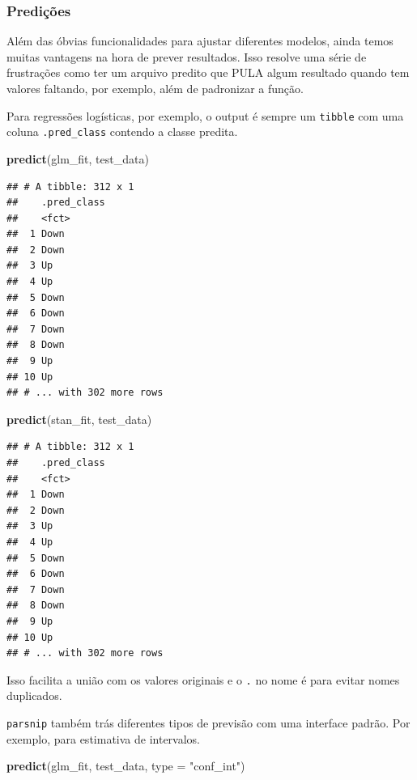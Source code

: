 \documentclass[
]{article}
\newenvironment{Shaded}{\begin{snugshade}}{\end{snugshade}}
\newcommand{\DataTypeTok}[1]{\textcolor[rgb]{0.13,0.29,0.53}{#1}}
\newcommand{\KeywordTok}[1]{\textcolor[rgb]{0.13,0.29,0.53}{\textbf{#1}}}
\newcommand{\NormalTok}[1]{#1}
\newcommand{\StringTok}[1]{\textcolor[rgb]{0.31,0.60,0.02}{#1}}
\begin{document}
\hypertarget{prediuxe7uxf5es}{%
\subsubsection{Predições}\label{prediuxe7uxf5es}}

Além das óbvias funcionalidades para ajustar diferentes modelos, ainda
temos muitas vantagens na hora de prever resultados. Isso resolve uma
série de frustrações como ter um arquivo predito que PULA algum
resultado quando tem valores faltando, por exemplo, além de padronizar a
função.

Para regressões logísticas, por exemplo, o output é sempre um
\texttt{tibble} com uma coluna \texttt{.pred\_class} contendo a classe
predita.

\begin{Shaded}
\begin{Highlighting}[]
\KeywordTok{predict}\NormalTok{(glm_fit, test_data)}
\end{Highlighting}
\end{Shaded}

\begin{verbatim}
## # A tibble: 312 x 1
##    .pred_class
##    <fct>      
##  1 Down       
##  2 Down       
##  3 Up         
##  4 Up         
##  5 Down       
##  6 Down       
##  7 Down       
##  8 Down       
##  9 Up         
## 10 Up         
## # ... with 302 more rows
\end{verbatim}

\begin{Shaded}
\begin{Highlighting}[]
\KeywordTok{predict}\NormalTok{(stan_fit, test_data)}
\end{Highlighting}
\end{Shaded}

\begin{verbatim}
## # A tibble: 312 x 1
##    .pred_class
##    <fct>      
##  1 Down       
##  2 Down       
##  3 Up         
##  4 Up         
##  5 Down       
##  6 Down       
##  7 Down       
##  8 Down       
##  9 Up         
## 10 Up         
## # ... with 302 more rows
\end{verbatim}

Isso facilita a união com os valores originais e o \texttt{.} no nome é
para evitar nomes duplicados.

\texttt{parsnip} também trás diferentes tipos de previsão com uma
interface padrão. Por exemplo, para estimativa de intervalos.

\begin{Shaded}
\begin{Highlighting}[]
\KeywordTok{predict}\NormalTok{(glm_fit, test_data, }\DataTypeTok{type =} \StringTok{"conf_int"}\NormalTok{)}
\end{Highlighting}
\end{Shaded}
\end{document}
